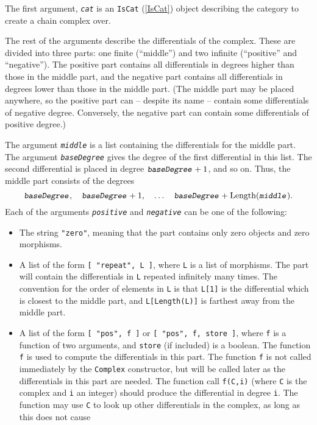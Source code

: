 \documentclass[a4paper,11pt]{report}
\begin{document}
{{{ The first argument, \mbox{\texttt{\slshape cat}} is an \texttt{IsCat} (\ref{IsCat}) object describing the category to create a chain complex over.

 The rest of the arguments describe the differentials of the complex. These are
divided into three parts: one finite (``middle'') and two infinite (``positive'' and ``negative''). The positive part contains all differentials in degrees higher than those
in the middle part, and the negative part contains all differentials in
degrees lower than those in the middle part. (The middle part may be placed
anywhere, so the positive part can -- despite its name -- contain some
differentials of negative degree. Conversely, the negative part can contain
some differentials of positive degree.)

 The argument \mbox{\texttt{\slshape middle}} is a list containing the differentials for the middle part. The argument \mbox{\texttt{\slshape baseDegree}} gives the degree of the first differential in this list. The second
differential is placed in degree $\mbox{\texttt{\slshape baseDegree}}+1$, and so on. Thus, the middle part consists of the degrees 
\[ \mbox{\texttt{\slshape baseDegree}},\quad \mbox{\texttt{\slshape baseDegree}} + 1,\quad \ldots\quad \mbox{\texttt{\slshape baseDegree}} + \text{Length}(\mbox{\texttt{\slshape middle}}). \]
 Each of the arguments \mbox{\texttt{\slshape positive}} and \mbox{\texttt{\slshape negative}} can be one of the following: 
\begin{itemize}
\item The string \texttt{"zero"}, meaning that the part contains only zero objects and zero morphisms.
\item A list of the form \texttt{[ "repeat", L ]}, where \texttt{L} is a list of morphisms. The part will contain the differentials in \texttt{L} repeated infinitely many times. The convention for the order of elements in \texttt{L} is that \texttt{L[1]} is the differential which is closest to the middle part, and \texttt{L[Length(L)]} is farthest away from the middle part.
\item A list of the form \texttt{[ "pos", f ]} or \texttt{[ "pos", f, store ]}, where \texttt{f} is a function of two arguments, and \texttt{store} (if included) is a boolean. The function \texttt{f} is used to compute the differentials in this part. The function \texttt{f} is not called immediately by the \texttt{Complex} constructor, but will be called later as the differentials in this part are
needed. The function call \texttt{f(C,i)} (where \texttt{C} is the complex and \texttt{i} an integer) should produce the differential in degree \texttt{i}. The function may use \texttt{C} to look up other differentials in the complex, as long as this does not cause

\end{itemize}}}}
\end{document}
